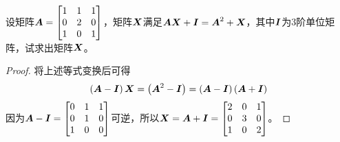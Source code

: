 \begin{problem}\label{problem-1.21}
设矩阵\(\boldsymbol{A}=\begin{bmatrix}1&1&1\\0&2&0\\1&0&1\end{bmatrix}\)，矩阵\(\boldsymbol{X}\)满足\(\boldsymbol{A}\boldsymbol{X}+\boldsymbol{I}=\boldsymbol{A}^2+\boldsymbol{X}\)，其中\(\boldsymbol{I}\)为\(3\)阶单位矩阵，试求出矩阵\(\boldsymbol{X}\)。
\end{problem}
\begin{proof}
    将上述等式变换后可得
    \begin{equation*}
        \left( \boldsymbol{A}-\boldsymbol{I} \right)\boldsymbol{X}=\left( \boldsymbol{A}^2-\boldsymbol{I} \right)=\left( \boldsymbol{A}-\boldsymbol{I} \right)\left( \boldsymbol{A}+\boldsymbol{I} \right)
    \end{equation*}
    因为\(\boldsymbol{A}-\boldsymbol{I}=\begin{bmatrix}0&1&1\\0&1&0\\1&0&0\end{bmatrix}\)可逆，所以\(\boldsymbol{X}=\boldsymbol{A}+\boldsymbol{I}=\begin{bmatrix}2&0&1\\0&3&0\\1&0&2\end{bmatrix}\)。
\end{proof}

